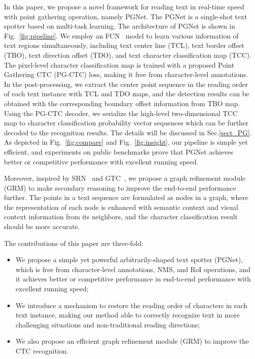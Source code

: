 \documentclass[letterpaper]{article} \usepackage{aaai21}  \usepackage{times}  \usepackage{helvet} \usepackage{courier}  \usepackage[hyphens]{url}  \usepackage{graphicx} \urlstyle{rm} \def\UrlFont{\rm}  \usepackage{natbib}  \usepackage{caption} \usepackage{bm}
\begin{document}
In this paper, we propose a novel framework for reading text in real-time speed with point gathering operation, namely PGNet. The PGNet is a single-shot text spotter based on multi-task learning. The architecture of PGNet is shown in Fig.~\ref{fig:pipeline}. We employ an FCN~\cite{milletari2016v} model to learn various information of text regions simultaneously, including text center line (TCL), text border offset (TBO), text direction offset (TDO), and text character classification map (TCC). The pixel-level character classification map is trained with a proposed Point Gathering CTC (PG-CTC) loss, making it free from character-level annotations. In the post-processing, we extract the center point sequence in the reading order of each text instance with TCL and TDO maps, and the detection results can be obtained with the corresponding boundary offset information from TBO map. Using the PG-CTC decoder, we serialize the high-level two-dimensional TCC map to character classification probability vector sequences which can be further decoded to the recognition results. The details will be discussed in Sec.\ref{sect_PG}. As depicted in  Fig.~\ref{fig:compare} and Fig.~\ref{fig:insight}, our pipeline is simple yet efficient, and experiments on public benchmarks prove that PGNet achieves better or competitive performance with excellent running speed.

Moreover, inspired by SRN~\cite{yu2020accurate} and GTC~\cite{hu2020gtc}, we propose a graph refinement module (GRM) to  make secondary reasoning to improve the end-to-end performance further. The points in a text sequence are formulated as nodes in a graph, where the representation of each node is enhanced with semantic context and visual context information from its neighbors, and the character classification result should be more accurate. 

The contributions of this paper are three-fold: 
\begin{itemize}
\item[] We propose a simple yet powerful arbitrarily-shaped text spotter (PGNet), which is free from character-level annotations, NMS, and RoI operations, and it achieves better or competitive performance in end-to-end performance with excellent running speed;
\item[] We introduce a mechanism to restore the reading order of characters in each text instance, making our method able to correctly recognize text in more challenging situations and non-traditional reading directions;
\item[] We also propose an efficient graph refinement module (GRM) to improve the CTC recognition.
\end{itemize}
\end{document}
